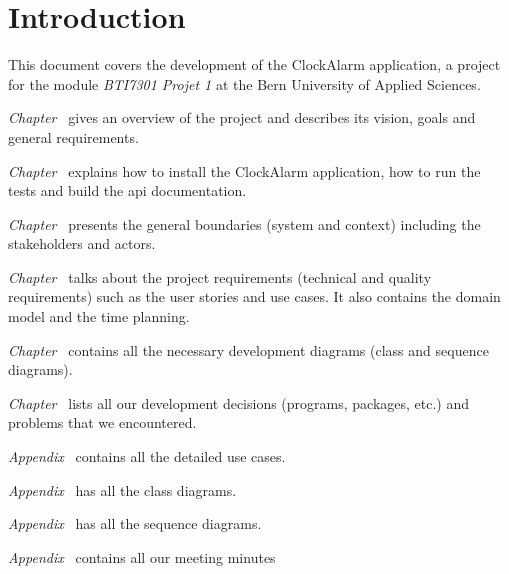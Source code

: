 \chapter{Introduction}

This document covers the development of the ClockAlarm application, a project
for the module \textit{BTI7301 Projet 1} at the Bern University of Applied
Sciences.

\textit{Chapter~} gives an overview of the
project and describes its vision, goals and general requirements.

\textit{Chapter~} explains how to install the
ClockAlarm application, how to run the tests and build the api documentation.

\textit{Chapter~} presents the general boundaries
(system and context) including the stakeholders and actors.

\textit{Chapter~} talks about the project requirements
(technical and quality requirements) such as the user stories and use cases. It
also contains the domain model and the time planning.

\textit{Chapter~} contains all the necessary development
diagrams (class and sequence diagrams).

\textit{Chapter~} lists all our development decisions
(programs, packages, etc.) and problems that we encountered.


\textit{Appendix~} contains all the detailed use
cases.

\textit{Appendix~} has all the class diagrams.

\textit{Appendix~} has all the sequence diagrams.

\textit{Appendix~} contains all our meeting minutes
